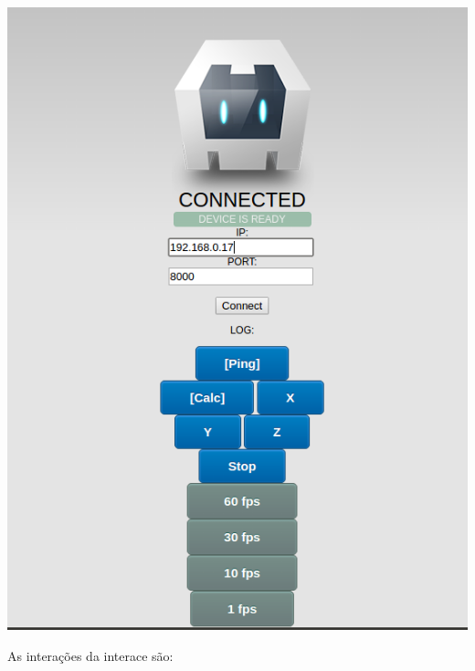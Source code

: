\documentclass[a4paper,12pt]{article}
\begin{document}
\newpage
\includegraphics[width=1\linewidth]{images/Cordova.png}
\newpage



As interações da interace são: %
\end{document}
